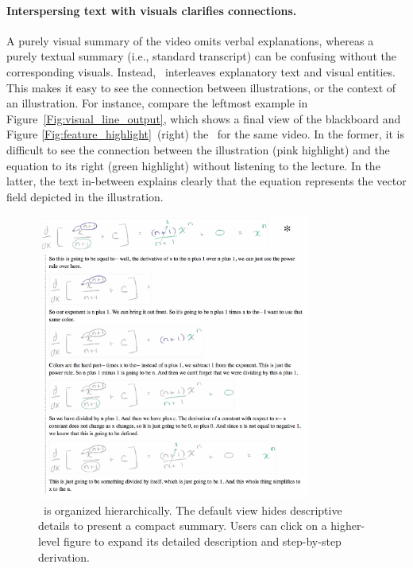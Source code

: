 \paragraph{Interspersing text with visuals clarifies connections.} A purely visual summary of the video omits verbal explanations, whereas a purely textual summary (i.e., standard transcript) can be confusing without the corresponding visuals. Instead, \systemname\ interleaves explanatory text and visual entities. This makes it easy to see the connection between illustrations, or the context of an illustration. For instance, compare the leftmost example in Figure~\ref{Fig:visual_line_output}, which shows a final view of the blackboard and Figure \ref{Fig:feature_highlight}~(right) the \systemname\ for the same video. In the former, it is difficult to see the connection between the illustration (pink highlight) and the equation to its right (green highlight) without listening to the lecture. In the latter, the text in-between explains clearly that the equation represents the vector field depicted in the illustration.
%
\begin{figure}[h!]
        \centering
        \includegraphics[width=0.8\textwidth]{figures/videonote_expand.pdf}
	\captionsetup{font=footnotesize}
        \caption{\systemname\ is organized hierarchically. The default view hides descriptive details to present a compact summary. Users can click on a higher-level figure to expand its detailed description and step-by-step derivation.} 
        \label{Fig:videonote_expanded}
\end{figure}\\
%
